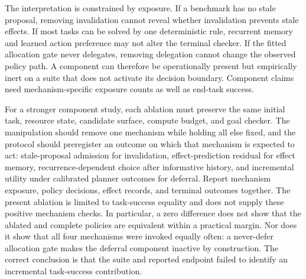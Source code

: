\documentclass[11pt]{article}
\begin{document}
The interpretation is constrained by exposure. If a benchmark has no stale proposal, removing invalidation cannot reveal whether invalidation prevents stale effects. If most tasks can be solved by one deterministic rule, recurrent memory and learned action preference may not alter the terminal checker. If the fitted allocation gate never delegates, removing delegation cannot change the observed policy path. A component can therefore be operationally present but empirically inert on a suite that does not activate its decision boundary. Component claims need mechanism-specific exposure counts as well as end-task success.

For a stronger component study, each ablation must preserve the same initial task, resource state, candidate surface, compute budget, and goal checker. The manipulation should remove one mechanism while holding all else fixed, and the protocol should preregister an outcome on which that mechanism is expected to act: stale-proposal admission for invalidation, effect-prediction residual for effect memory, recurrence-dependent choice after informative history, and incremental utility under calibrated planner outcomes for deferral. Report mechanism exposure, policy decisions, effect records, and terminal outcomes together. The present ablation is limited to task-success equality and does not supply these positive mechanism checks. In particular, a zero difference does not show that the ablated and complete policies are equivalent within a practical margin. Nor does it show that all four mechanisms were invoked equally often: a never-defer allocation gate makes the deferral component inactive by construction. The correct conclusion is that the suite and reported endpoint failed to identify an incremental task-success contribution.
\end{document}
